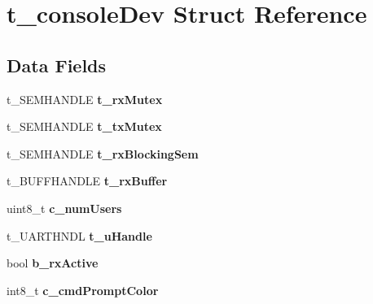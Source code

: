 \hypertarget{structt__console_dev}{\section{t\-\_\-console\-Dev Struct Reference}
\label{structt__console_dev}
}
\subsection*{Data Fields}
\begin{DoxyCompactItemize}
\item 
\hypertarget{structt__console_dev_a6c668c5c6ef7ecd4aa0eeca1dc3352cf}{t\-\_\-\-S\-E\-M\-H\-A\-N\-D\-L\-E {\bfseries t\-\_\-rx\-Mutex}}\label{structt__console_dev_a6c668c5c6ef7ecd4aa0eeca1dc3352cf}

\item 
\hypertarget{structt__console_dev_a17abeacecc1a41425fc9fd04a89e026e}{t\-\_\-\-S\-E\-M\-H\-A\-N\-D\-L\-E {\bfseries t\-\_\-tx\-Mutex}}\label{structt__console_dev_a17abeacecc1a41425fc9fd04a89e026e}

\item 
\hypertarget{structt__console_dev_aedc039854e5cfc913eb025a5b4d8e744}{t\-\_\-\-S\-E\-M\-H\-A\-N\-D\-L\-E {\bfseries t\-\_\-rx\-Blocking\-Sem}}\label{structt__console_dev_aedc039854e5cfc913eb025a5b4d8e744}

\item 
\hypertarget{structt__console_dev_abfbc70e94616edab7b4177058a7f188d}{t\-\_\-\-B\-U\-F\-F\-H\-A\-N\-D\-L\-E {\bfseries t\-\_\-rx\-Buffer}}\label{structt__console_dev_abfbc70e94616edab7b4177058a7f188d}

\item 
\hypertarget{structt__console_dev_a65907c8d88006e5cdc5e6b18eb4606ba}{uint8\-\_\-t {\bfseries c\-\_\-num\-Users}}\label{structt__console_dev_a65907c8d88006e5cdc5e6b18eb4606ba}

\item 
\hypertarget{structt__console_dev_adff9fcc9b301fd4d7521fb37d7490034}{t\-\_\-\-U\-A\-R\-T\-H\-N\-D\-L {\bfseries t\-\_\-u\-Handle}}\label{structt__console_dev_adff9fcc9b301fd4d7521fb37d7490034}

\item 
\hypertarget{structt__console_dev_a3462e997b9d47e7d2ec8f1144035fbf0}{bool {\bfseries b\-\_\-rx\-Active}}\label{structt__console_dev_a3462e997b9d47e7d2ec8f1144035fbf0}

\item 
\hypertarget{structt__console_dev_a438be64e1e5f557076bc94c2c50e28d1}{int8\-\_\-t {\bfseries c\-\_\-cmd\-Prompt\-Color}}\label{structt__console_dev_a438be64e1e5f557076bc94c2c50e28d1}


\end{DoxyCompactItemize}
